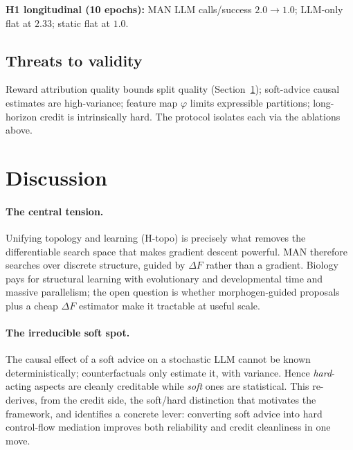 \documentclass[11pt]{article}
\theoremstyle{definition}
\begin{document}
\noindent\textbf{H1 longitudinal (10 epochs):} MAN LLM calls/success
$2.0 \rightarrow 1.0$; LLM-only flat at $2.33$; static flat at $1.0$.





\subsection{Threats to validity}
Reward attribution quality bounds split quality (Section~\ref{sec:discussion});
soft-advice causal estimates are high-variance; feature map $\varphi$ limits
expressible partitions; long-horizon credit is intrinsically hard. The
protocol isolates each via the ablations above.

\section{Discussion}
\label{sec:discussion}

\paragraph{The central tension.}
Unifying topology and learning (H-topo) is precisely what removes the
differentiable search space that makes gradient descent powerful. MAN
therefore searches over discrete structure, guided by $\Delta F$ rather than
a gradient. Biology pays for structural learning with evolutionary and
developmental time and massive parallelism; the open question is whether
morphogen-guided proposals plus a cheap $\Delta F$ estimator make it
tractable at useful scale.

\paragraph{The irreducible soft spot.}
The causal effect of a soft advice on a stochastic LLM cannot be known
deterministically; counterfactuals only estimate it, with variance. Hence
\emph{hard}-acting aspects are cleanly creditable while \emph{soft} ones are
statistical. This re-derives, from the credit side, the soft/hard
distinction that motivates the framework, and identifies a concrete lever:
converting soft advice into hard control-flow mediation improves both
reliability and credit cleanliness in one move.
\end{document}
